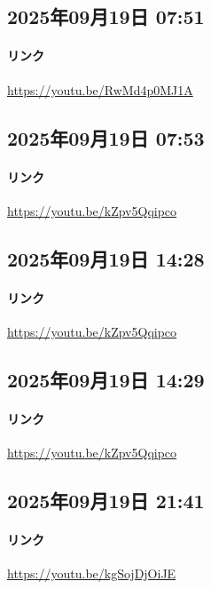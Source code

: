 \subsection*{2025年09月19日 07:51}

\paragraph{リンク}
\url{https://youtu.be/RwMd4p0MJ1A}

\subsection*{2025年09月19日 07:53}

\paragraph{リンク}
\url{https://youtu.be/kZpv5Qqipco}

\subsection*{2025年09月19日 14:28}

\paragraph{リンク}
\url{https://youtu.be/kZpv5Qqipco}

\subsection*{2025年09月19日 14:29}

\paragraph{リンク}
\url{https://youtu.be/kZpv5Qqipco}

\subsection*{2025年09月19日 21:41}

\paragraph{リンク}
\url{https://youtu.be/kgSojDjOiJE}

